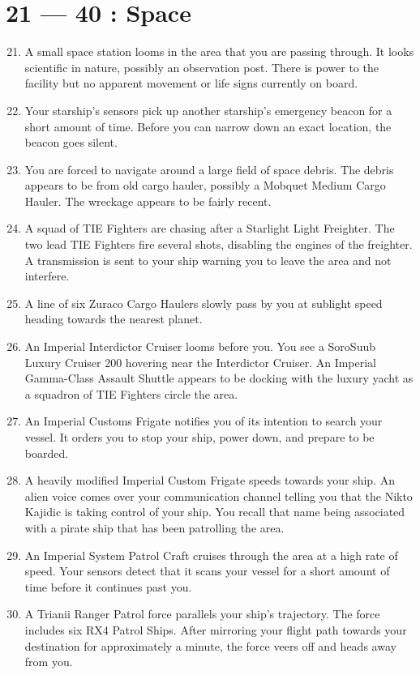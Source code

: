 \documentclass{article}
\begin{document}
\section*{21 --- 40 : Space}
\begin{enumerate}
	\setcounter{enumi}{20}
	\item A small space station looms in the area that you are passing through. It looks scientific in nature, possibly an observation post. There is power to the facility but no apparent movement or life signs currently on board.
	\item Your starship’s sensors pick up another starship’s emergency beacon for a short amount of time. Before you can narrow down an exact location, the beacon goes silent.
	\item You are forced to navigate around a large field of space debris. The debris appears to be from old cargo hauler, possibly a Mobquet Medium Cargo Hauler. The wreckage appears to be fairly recent.
	\item A squad of TIE Fighters are chasing after a Starlight Light Freighter. The two lead TIE Fighters fire several shots, disabling the engines of the freighter. A transmission is sent to your ship warning you to leave the area and not interfere.
	\item A line of six Zuraco Cargo Haulers slowly pass by you at sublight speed heading towards the nearest planet.
	\item An Imperial Interdictor Cruiser looms before you. You see a SoroSuub Luxury Cruiser 200 hovering near the Interdictor Cruiser. An Imperial Gamma-Class Assault Shuttle appears to be docking with the luxury yacht as a squadron of TIE Fighters circle the area.
	\item An Imperial Customs Frigate notifies you of its intention to search your vessel. It orders you to stop your ship, power down, and prepare to be boarded.
	\item A heavily modified Imperial Custom Frigate speeds towards your ship. An alien voice comes over your communication channel telling you that the Nikto Kajidic is taking control of your ship. You recall that name being associated with a pirate ship that has been patrolling the area.
	\item An Imperial System Patrol Craft cruises through the area at a high rate of speed. Your sensors detect that it scans your vessel for a short amount of time before it continues past you.
	\item A Trianii Ranger Patrol force parallels your ship’s trajectory. The force includes six RX4 Patrol Ships. After mirroring your flight path towards your destination for approximately a minute, the force veers off and heads away from you.

\end{enumerate}
\end{document}
